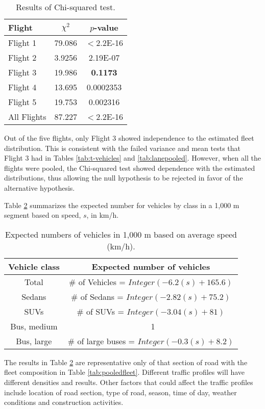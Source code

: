 \begin{table}[H]
\centering
\caption{Results of Chi-squared test.}
\label{tb:chivalidate}
\begin{tabular}{@{}lcc@{}}
\toprule
\textbf{Flight} & \textbf{$\chi^{2}$} & \textbf{$p$-value} \\ \midrule
Flight 1 & 79.086 & $< 2.2$E-16 \\
Flight 2 & 3.9256 & 2.19E-07 \\
Flight 3 & 19.986 & \textbf{0.1173} \\
Flight 4 & 13.695 & 0.0002353 \\
Flight 5 & 19.753 & 0.002316 \\
All Flights & 87.227 & $< 2.2$E-16 \\ \bottomrule
\end{tabular}
\end{table}

Out of the five flights, only Flight 3 showed independence to the estimated fleet distribution. This is consistent with the failed variance and mean tests that Flight 3 had in Tables \ref{tab:t-vehicles} and \ref{tab:lanepooled}. However, when all the flights were pooled, the Chi-squared test showed dependence with the estimated distributions, thus allowing the null hypothesis to be rejected in favor of the alternative hypothesis.

Table \ref{tb4:expectedvehicles} summarizes the expected number for vehicles by class in a 1,000 m segment based on speed, $s$, in km/h.
%
\begin{table}[H]
\centering
\caption{ Expected numbers of vehicles in 1,000 m based on average speed (km/h).}
\label{tb4:expectedvehicles}
\begin{tabular}{@{}cc@{}}
\toprule
\textbf{Vehicle class} & \textbf{Expected number of vehicles } \\ \midrule
Total & \# of Vehicles = $Integer(-6.2(s) + 165.6)$ \\
Sedans & \# of Sedans = $Integer (-2.82(s) + 75.2)$ \\
SUVs & \# of SUVs = $Integer (-3.04(s) + 81)$ \\
Bus, medium & \ 1 \\
Bus, large & \# of large buses = $Integer (-0.3(s) + 8.2)$ \\ \bottomrule
\end{tabular}
\end{table}
%
The results in Table \ref{tb4:expectedvehicles} are representative only of that section of road with the fleet composition in Table \ref{tab:pooledfleet}.  Different traffic profiles will have different densities and results.  Other factors that could affect the traffic profiles include location of road section, type of road, season, time of day, weather conditions and construction activities. 
 
